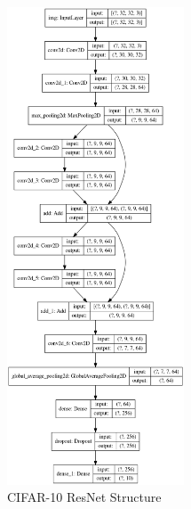 \documentclass[]{article}
\begin{document}
\begin{figure}[H]
    \centering
    \includegraphics[width=0.47\textwidth]{cifar10_model.png}
    \caption{CIFAR-10 ResNet Structure}
\end{figure}
\end{document}
